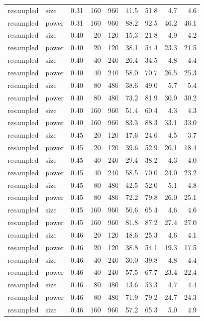 \begin{table}[p]
\begin{tabular}{@{}llrrrrrrr@{}}
resampled & size & 0.31 & 160 & 960 & 41.5 & 51.8 & 4.7 & 4.6 \\
resampled & power & 0.31 & 160 & 960 & 88.2 & 92.5 & 46.2 & 46.1 \\
resampled & size & 0.40 & 20 & 120 & 15.3 & 21.8 & 4.9 & 4.2 \\
resampled & power & 0.40 & 20 & 120 & 38.1 & 54.4 & 23.3 & 21.5 \\
resampled & size & 0.40 & 40 & 240 & 26.4 & 34.5 & 4.8 & 4.4 \\
resampled & power & 0.40 & 40 & 240 & 58.0 & 70.7 & 26.5 & 25.3 \\
resampled & size & 0.40 & 80 & 480 & 38.6 & 49.0 & 5.7 & 5.4 \\
resampled & power & 0.40 & 80 & 480 & 73.2 & 81.9 & 30.9 & 30.2 \\
resampled & size & 0.40 & 160 & 960 & 51.4 & 60.4 & 4.3 & 4.3 \\
resampled & power & 0.40 & 160 & 960 & 83.3 & 88.3 & 33.1 & 33.0 \\
resampled & size & 0.45 & 20 & 120 & 17.6 & 24.6 & 4.5 & 3.7 \\
resampled & power & 0.45 & 20 & 120 & 39.6 & 52.9 & 20.1 & 18.4 \\
resampled & size & 0.45 & 40 & 240 & 29.4 & 38.2 & 4.3 & 4.0 \\
resampled & power & 0.45 & 40 & 240 & 58.5 & 70.0 & 24.0 & 23.2 \\
resampled & size & 0.45 & 80 & 480 & 42.5 & 52.0 & 5.1 & 4.8 \\
resampled & power & 0.45 & 80 & 480 & 72.2 & 79.8 & 26.0 & 25.1 \\
resampled & size & 0.45 & 160 & 960 & 56.6 & 65.4 & 4.6 & 4.6 \\
resampled & power & 0.45 & 160 & 960 & 81.8 & 87.2 & 27.4 & 27.0 \\
resampled & size & 0.46 & 20 & 120 & 18.6 & 25.3 & 4.6 & 4.1 \\
resampled & power & 0.46 & 20 & 120 & 38.8 & 54.1 & 19.3 & 17.5 \\
resampled & size & 0.46 & 40 & 240 & 30.0 & 39.8 & 4.8 & 4.4 \\
resampled & power & 0.46 & 40 & 240 & 57.5 & 67.7 & 23.4 & 22.4 \\
resampled & size & 0.46 & 80 & 480 & 43.6 & 53.3 & 4.7 & 4.4 \\
resampled & power & 0.46 & 80 & 480 & 71.9 & 79.2 & 24.7 & 24.3 \\
resampled & size & 0.46 & 160 & 960 & 57.2 & 65.3 & 5.0 & 4.9 \\

\end{tabular}
\end{table}
